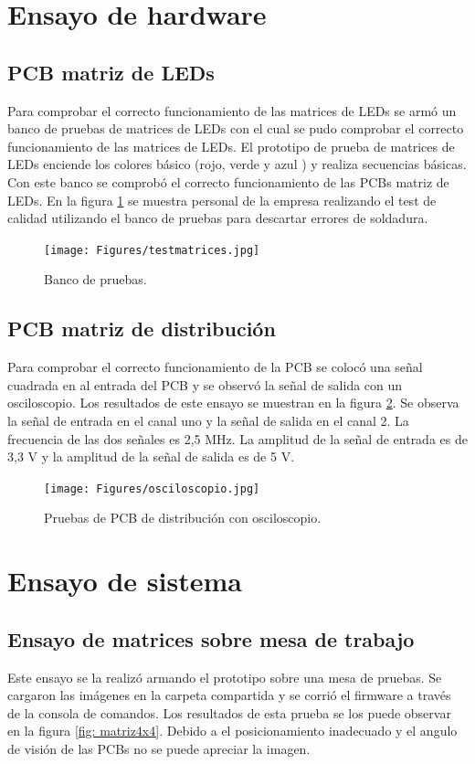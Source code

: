 \section{Ensayo de hardware}
\subsection{PCB matriz de LEDs}
Para comprobar el correcto funcionamiento de las matrices de LEDs se armó un banco de pruebas de matrices de LEDs con el cual se pudo comprobar el correcto funcionamiento de las matrices de LEDs. El prototipo de prueba de matrices de LEDs enciende los colores básico (rojo, verde y azul ) y realiza secuencias básicas. Con este banco se comprobó el correcto funcionamiento de las PCBs matriz de LEDs. En la figura \ref{fig: banco de pruebas} se muestra personal de la empresa realizando el  test de calidad utilizando el banco de pruebas para descartar errores de soldadura.

\begin{figure}[htpb]
	\centering
	\texttt{[image: Figures/testmatrices.jpg]} 
	\caption{Banco de pruebas.}
	\label{fig: banco de pruebas}
\end{figure}



\subsection{PCB matriz de distribución}
Para comprobar el correcto funcionamiento de la PCB se colocó una señal cuadrada en al entrada del PCB y se observó la señal de salida con un osciloscopio. Los resultados de este ensayo se muestran en la figura \ref{fig: capturaosciloscopio}. Se observa la señal de entrada en el canal uno y la señal de salida en el canal 2. La frecuencia de las dos señales es 2,5 MHz. La amplitud de la señal de entrada es de 3,3 V y la amplitud de la señal de salida es de 5 V. 

\begin{figure}[htpb]
	\centering
	\texttt{[image: Figures/osciloscopio.jpg]} 
	\caption{Pruebas de PCB de distribución con osciloscopio.}
	\label{fig: capturaosciloscopio}
\end{figure}




\section{Ensayo de sistema}
\subsection{Ensayo de matrices sobre mesa de trabajo}
Este ensayo se la realizó armando el prototipo sobre una mesa de pruebas. Se cargaron las imágenes en la carpeta compartida y se corrió el firmware a través de la consola de comandos. Los resultados de esta prueba se los puede observar en la figura \ref{fig: matriz4x4}. Debido a el posicionamiento inadecuado y el angulo de visión de las PCBs no se puede apreciar la imagen.

